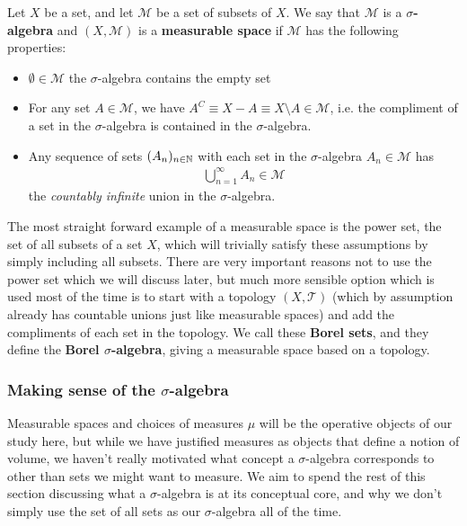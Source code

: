 \documentclass[11pt]{article}
\begin{document}
\begin{definition}
Let $X$ be a set, and let $\mathcal M$ be a set of subsets of $X$. We say that $\mathcal M$ is a $\sigma$\textbf{-algebra} and $(X,\mathcal M)$ is a \textbf{measurable space} if $\mathcal M$ has the following properties: \begin{itemize}
\item $\emptyset \in \mathcal M$ the $\sigma$-algebra contains the empty set
\item For any set $A \in \mathcal M$, we have $A^C \equiv X - A \equiv X \setminus A \in \mathcal M$, i.e. the compliment of a set in the $\sigma$-algebra is contained in the $\sigma$-algebra. 
\item Any sequence of sets $(A_n)_{n \in \mathbb{N}}$ with each set in the $\sigma$-algebra $A_n \in \mathcal M$ has \begin{gather*}
\bigcup_{n=1}^\infty A_n \in \mathcal M
\end{gather*}
the \emph{countably infinite} union in the $\sigma$-algebra.
\end{itemize}
\end{definition}

The most straight forward example of a measurable space is the power set, the set of all subsets of a set $X$, which will trivially satisfy these assumptions by simply including all subsets. There are very important reasons not to use the power set which we will discuss later, but much more sensible option which is used most of the time is to start with a topology $(X,\mathcal T)$ (which by assumption already has countable unions just like measurable spaces) and add the compliments of each set in the topology. We call these \textbf{Borel sets}, and they define the \textbf{Borel $\sigma$-algebra}, giving a measurable space based on a topology.

\subsubsection{Making sense of the $\sigma$-algebra}

Measurable spaces and choices of measures $\mu$ will be the operative objects of our study here, but while we have justified measures as objects that define a notion of volume, we haven't really motivated what concept a $\sigma$-algebra corresponds to other than sets we might want to measure. We aim to spend the rest of this section discussing what a $\sigma$-algebra is at its conceptual core, and why we don't simply use the set of all sets as our $\sigma$-algebra all of the time. 
\end{document}

